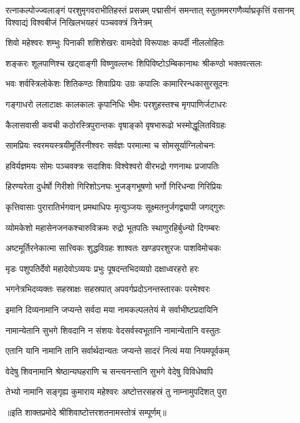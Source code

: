 

{रत्नाकल्पोज्ज्वलाङ्गं परशुमृगवराभीतिहस्तं प्रसन्नम्}
{पद्मासीनं समन्तात् स्तुतममरगणैर्व्याघ्रकृत्तिं वसानम्}
{विश्वाद्यं विश्वबीजं निखिलभयहरं पञ्चवक्त्रं त्रिनेत्रम्}

\twolineshloka
{शिवो महेश्वरः शम्भुः पिनाकी शशिशेखरः}
{वामदेवो विरूपाक्षः कपर्दी नीललोहितः}

\twolineshloka
{शङ्करः शूलपाणिश्च खट्वाङ्गी विष्णुवल्लभः}
{शिपिविष्टोऽम्बिकानाथः श्रीकण्ठो भक्तवत्सलः}

\twolineshloka
{भवः शर्वस्त्रिलोकेशः शितिकण्ठः शिवाप्रियः}
{उग्रः कपालिः कामारिरन्धकासुरसूदनः}

\twolineshloka
{गङ्गाधरो ललाटाक्षः कालकालः कृपानिधिः}
{भीमः परशुहस्तश्च मृगपाणिर्जटाधरः}

\twolineshloka
{कैलासवासी कवची कठोरस्त्रिपुरान्तकः}
{वृषाङ्को वृषभारूढो भस्मोद्धूलितविग्रहः}

\twolineshloka
{सामप्रियः स्वरमयस्त्रयीमूर्तिरनीश्वरः}
{सर्वज्ञः परमात्मा च सोमसूर्याग्निलोचनः}

\twolineshloka
{हविर्यज्ञमयः सोमः पञ्चवक्त्रः सदाशिवः}
{विश्वेश्वरो वीरभद्रो गणनाथः प्रजापतिः}

\twolineshloka
{हिरण्यरेता दुर्धर्षो गिरीशो गिरिशोऽनघः}
{भुजङ्गभूषणो भर्गो गिरिधन्वा गिरिप्रियः}

\twolineshloka
{कृत्तिवासाः पुरारातिर्भगवान् प्रमथाधिपः}
{मृत्युञ्जयः सूक्ष्मतनुर्जगद्व्यापी जगद्गुरुः}

\twolineshloka
{व्योमकेशो महासेनजनकश्चारुविक्रमः}
{रुद्रो भूतपतिः स्थाणुरहिर्बुध्न्यो दिगम्बरः}

\twolineshloka
{अष्टमूर्तिरनेकात्मा सात्त्विकः शुद्धविग्रहः}
{शाश्वतः खण्डपरशुरजः पाशविमोचकः}

\twolineshloka
{मृडः पशुपतिर्देवो महादेवोऽव्ययः प्रभुः}
{पूषदन्तभिदव्यग्रो दक्षाध्वरहरो हरः}

\twolineshloka
{भगनेत्रभिदव्यक्तः सहस्राक्षः सहस्रपात्}
{अपवर्गप्रदोऽनन्तस्तारकः परमेश्वरः}

\twolineshloka
{इमानि दिव्यनामानि जप्यन्ते सर्वदा मया}
{नामकल्पलतेयं मे सर्वाभीष्टप्रदायिनि}

\twolineshloka
{नामान्येतानि सुभगे शिवदानि न संशयः}
{वेदसर्वस्वभूतानि नामान्येतानि वस्तुतः}

\twolineshloka
{एतानि यानि नामानि तानि सर्वार्थदान्यतः}
{जप्यन्ते सादरं नित्यं मया नियमपूर्वकम्}

\twolineshloka
{वेदेषु शिवनामानि श्रेष्ठान्यघहराणि च}
{सन्त्यनन्तानि सुभगे वेदेषु विविधेष्वपि}

\twolineshloka
{तेभ्यो नामानि सङ्गृह्य कुमाराय महेश्वरः}
{अष्टोत्तरसहस्रं तु नाम्नामुपदिशत् पुरा}

{॥इति शाक्तप्रमोदे श्रीशिवाष्टोत्तरशतनामस्तोत्रं सम्पूर्णम्॥}